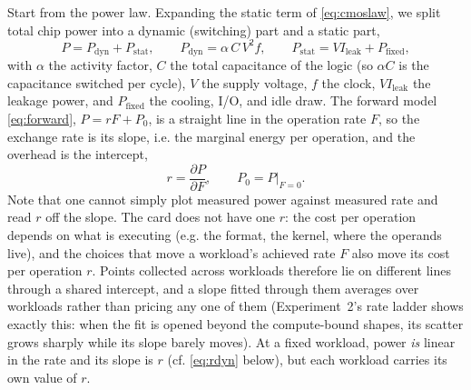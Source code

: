 \documentclass{article}
\theoremstyle{plain}
\theoremstyle{definition}
\theoremstyle{remark}
\begin{document}
Start from the power law. Expanding the
static term of \cref{eq:cmoslaw}, we split total chip power into a dynamic
(switching) part and a static part,
\begin{equation}
	P = P_{\mathrm{dyn}} + P_{\mathrm{stat}}, \qquad
	P_{\mathrm{dyn}} = \alpha\, C\, V^2 f, \qquad
	P_{\mathrm{stat}} = V I_{\mathrm{leak}} + P_{\mathrm{fixed}},
	\label{eq:powertotal}
\end{equation}
with $\alpha$ the activity factor, $C$ the total capacitance of the logic
(so $\alpha C$ is the capacitance switched per cycle), $V$ the
supply voltage, $f$ the clock, $V I_{\mathrm{leak}}$ the leakage power, and
$P_{\mathrm{fixed}}$ the cooling, I/O, and idle draw. The forward model
\cref{eq:forward}, $P = rF + P_0$, is a straight line in the operation rate $F$,
so the exchange rate is its slope, i.e. the marginal energy per operation, and the overhead
is the intercept,
\begin{equation}
	r = \frac{\partial P}{\partial F}, \qquad P_0 = P\big|_{F=0}.
	\label{eq:marginal}
\end{equation}
Note that one cannot simply plot measured power
against measured rate and read $r$ off the slope. The card does not have one
$r$: the cost per operation depends on what is executing (e.g. the format, the
kernel, where the operands live), and the choices that move a workload's
achieved rate $F$ also move its cost per operation $r$. Points collected across
workloads therefore lie on different lines through a shared intercept, and a
slope fitted through them averages over workloads rather than pricing any one
of them (Experiment~2's rate ladder shows exactly this: when the fit is opened beyond
the compute-bound shapes, its scatter grows sharply while its slope barely
moves). At a fixed workload, power \emph{is} linear in the rate and its slope
is $r$ (cf. \cref{eq:rdyn} below), but each workload carries its own value of $r$.
\end{document}
